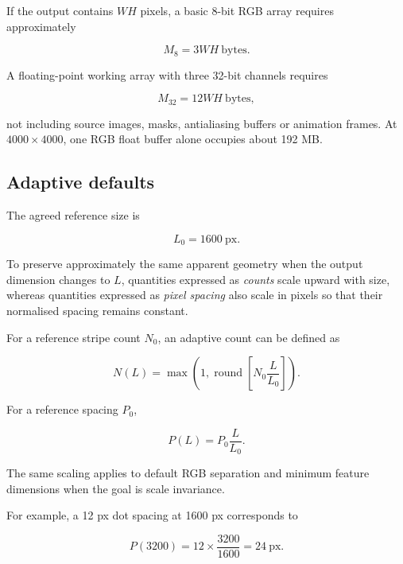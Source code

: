 If the output contains $WH$ pixels, a basic 8-bit RGB array requires approximately

\begin{equation}
M_{8}=3WH\ \text{bytes}.
\label{eq:memory8}
\end{equation}

A floating-point working array with three 32-bit channels requires

\begin{equation}
M_{32}=12WH\ \text{bytes},
\label{eq:memory32}
\end{equation}

not including source images, masks, antialiasing buffers or animation frames. At $4000\times4000$, one RGB float buffer alone occupies about 192 MB.

\subsection{Adaptive defaults}

The agreed reference size is

\begin{equation}
L_0=1600\ \text{px}.
\end{equation}

To preserve approximately the same apparent geometry when the output dimension changes to $L$, quantities expressed as \emph{counts} scale upward with size, whereas quantities expressed as \emph{pixel spacing} also scale in pixels so that their normalised spacing remains constant.

For a reference stripe count $N_0$, an adaptive count can be defined as

\begin{equation}
N(L)=\max\!\left(1,\operatorname{round}\!\left[N_0\frac{L}{L_0}\right]\right).
\label{eq:adaptivecount}
\end{equation}

For a reference spacing $P_0$,

\begin{equation}
P(L)=P_0\frac{L}{L_0}.
\label{eq:adaptivespacing}
\end{equation}

The same scaling applies to default RGB separation and minimum feature dimensions when the goal is scale invariance.

For example, a 12 px dot spacing at 1600 px corresponds to

\begin{equation}
P(3200)=12\times\frac{3200}{1600}=24\ \text{px}.
\end{equation}

